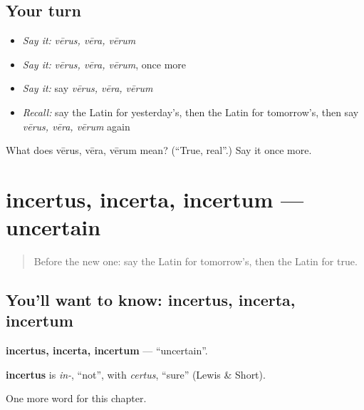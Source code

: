 \subsection*{Your turn}
\begin{itemize}
\raggedright
  \item \emph{Say it:} \emph{vērus, vēra, vērum}
  \item \emph{Say it:} \emph{vērus, vēra, vērum}, once more
  \item \emph{Say it:} say \emph{vērus, vēra, vērum}
  \item \emph{Recall:} say the Latin for yesterday's, then the Latin for tomorrow's, then say \emph{vērus, vēra, vērum} again
\end{itemize}

\begin{tcolorbox}[breakable,colback=teal!4,colframe=teal!35!black,title={Before you move on}]
What does vērus, vēra, vērum mean? (\textquotedblleft{}True, real\textquotedblright{}.) Say it once more.
\end{tcolorbox}
\section[incertus, incerta, incertum]{incertus, incerta, incertum — uncertain}

\label{lesson:LA-C215-incertus}



\begin{quote}
Before the new one: say the Latin for tomorrow's, then the Latin for true.
\end{quote}

\subsection*{You'll want to know: incertus, incerta, incertum}
\textbf{incertus, incerta, incertum} — \textquotedblleft{}uncertain\textquotedblright{}.

\begin{cousinweb}
\textbf{incertus} is \emph{in-}, \textquotedblleft{}not\textquotedblright{}, with \emph{certus}, \textquotedblleft{}sure\textquotedblright{} (Lewis \& Short).
\end{cousinweb}

\begin{grammarlens}[title={What you've built}]
One more word for this chapter.
\end{grammarlens}

